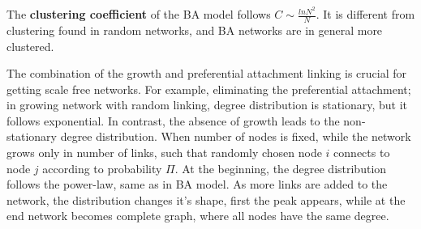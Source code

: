 The \textbf{clustering coefficient} of the BA model follows $C \sim \frac{ln N^2}{N}$. It is different from clustering found in random networks, and BA networks are in general more clustered. 

The combination of the growth and preferential attachment linking is crucial for getting scale free networks. For example, eliminating the preferential attachment; in growing network with random linking, degree distribution is stationary, but it follows exponential. In contrast, the absence of growth leads to the non-stationary degree distribution. When number of nodes is fixed, while the network grows only in number of links, such that randomly chosen node $i$ connects to node $j$ according to probability $\Pi$. At the beginning, the degree distribution follows the power-law, same as in BA model. As more links are added to the network, the distribution changes it's shape, first the peak appears, while at the end network becomes complete graph, where all nodes have the same degree.  



